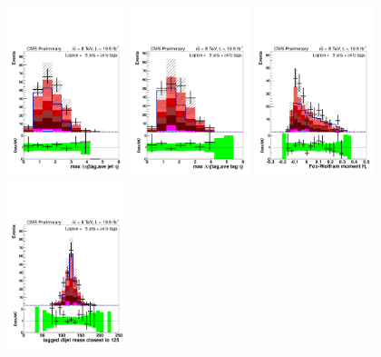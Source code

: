 \begin{figure}[hbtp]
 \begin{center}
   \includegraphics[width=0.31\textwidth]{Figures/Analysis_2_Diagrams/LJ_plots_lep/5j4t/lep_maxeta_jet_tag_5j4t_cumulative_wRatio_noLegend_lin.pdf}
   \includegraphics[width=0.31\textwidth]{Figures/Analysis_2_Diagrams/LJ_plots_lep/5j4t/lep_maxeta_tag_tag_5j4t_cumulative_wRatio_noLegend_lin.pdf}
   \includegraphics[width=0.31\textwidth]{Figures/Analysis_2_Diagrams/LJ_plots_lep/5j4t/lep_h1_5j4t_cumulative_wRatio_noLegend_lin.pdf}
   \includegraphics[width=0.31\textwidth]{Figures/Analysis_2_Diagrams/LJ_plots_lep/5j4t/lep_tagged_dijet_mass_closest_to_125_5j4t_cumulative_wRatio_noLegend_lin.pdf}  

\end{center}
\end{figure}
